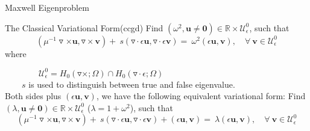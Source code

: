 \documentclass[13pt]{beamer}
\begin{document}
\begin{frame}[t]{Maxwell Eigenproblem}
   \begin{block}{The Classical Variational Form(ccgd)}
    Find $(\omega^2, \mathbf{u}\neq\mathbf{0})\in\mathbb{R}\times\mathcal{U}^0_{\epsilon}$, such that
   {\color{red}
    \[(\mu^{-1}\triangledown\times\mathbf{u},\triangledown\times\mathbf{v}) + \
    s(\triangledown\cdot\epsilon\mathbf{u},\triangledown\cdot\epsilon\mathbf{v}) = \
    \omega^2(\epsilon\mathbf{u},\mathbf{v}),\quad \forall\ \mathbf{v}\in\mathcal{U}^0_{\epsilon}\]
   }
   where

   {\color{blue}
   $\qquad\qquad\mathcal{U}^0_{\epsilon} = H_0(\triangledown\times; \Omega)\cap H_0(\triangledown\cdot \epsilon; \Omega)$
   }\\
   $\qquad s$ is used to distinguish between true and false eigenvalue.\\

   Both sides plus $(\epsilon\mathbf{u},\mathbf{v})$, we have the following equivalent variational form:
   Find $(\lambda, \mathbf{u}\neq\mathbf{0})\in\mathbb{R}\times\mathcal{U}^0_{\epsilon}$ ($\lambda = 1+ \omega^2$), such that
   {\color{red}
    \[(\mu^{-1}\triangledown\times\mathbf{u},\triangledown\times\mathbf{v}) + \
    s(\triangledown\cdot\epsilon\mathbf{u},\triangledown\cdot\epsilon\mathbf{v}) + (\epsilon\mathbf{u},\mathbf{v}) = \
    \lambda(\epsilon\mathbf{u},\mathbf{v}),\quad \forall\ \mathbf{v}\in\mathcal{U}^0_{\epsilon}\]
   }
   \end{block}
\end{frame}
\end{document}
